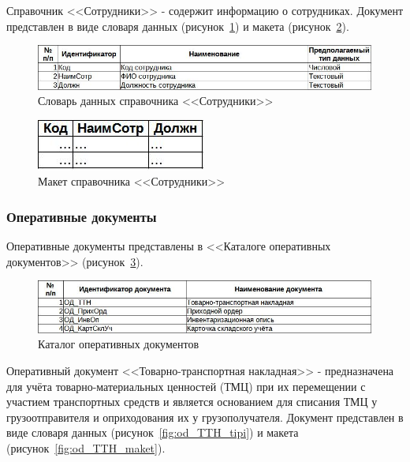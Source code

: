 \documentclass[12pt, a4paper, simple]{eskdtext}
\begin{document}
    Справочник <<Сотрудники>> - содержит информацию о сотрудниках.
    Документ представлен в виде словаря данных (рисунок~\ref{fig:cd_Sotr_tipi})
    и макета (рисунок~\ref{fig:cd_Sotr_maket}).

    \begin{figure}[!h]
        \centering
        \includegraphics[width=14cm]
            {_docs/СП_Сотр_типы.jpg}
        \caption{Словарь данных справочника <<Сотрудники>>}
        \label{fig:cd_Sotr_tipi}
    \end{figure}

    \begin{figure}[!h]
        \centering
        \includegraphics[]
            {_docs/СП_Сотр_макет.jpg}
        \caption{Макет справочника <<Сотрудники>>}
        \label{fig:cd_Sotr_maket}
    \end{figure}

    \subsubsection{Оперативные документы}

    Оперативные документы представлены в <<Каталоге оперативных документов>> (рисунок~\ref{fig:od}).
    
    \begin{figure}[!h]
        \centering
        \includegraphics[width=14cm]
            {_docs/ОП_.jpg}
        \caption{Каталог оперативных документов}
        \label{fig:od}
    \end{figure}

    \newpage

    Оперативный документ <<Товарно-транспортная накладная>> - предназначена для учёта
    товарно-материальных ценностей (ТМЦ) при их перемещении с участием транспортных средств
    и является основанием для списания ТМЦ у грузоотправителя и оприходования их у грузополучателя.
    Документ представлен в виде словаря данных (рисунок~\ref{fig:od_TTH_tipi})
    и макета (рисунок~\ref{fig:od_TTH_maket}).
\end{document}

